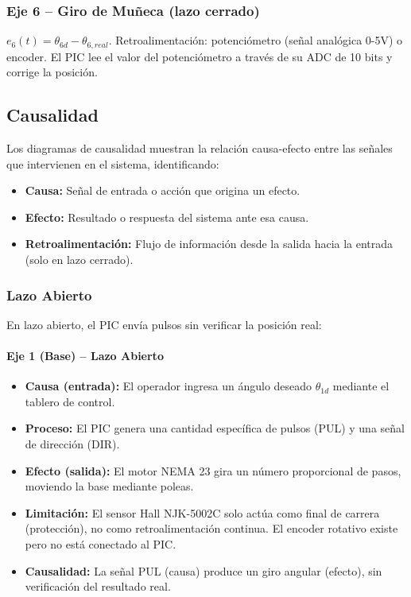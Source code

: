 \documentclass[11pt]{article}
\begin{document}
\subsubsection{Eje 6 – Giro de Muñeca (lazo cerrado)}

$e_6(t) = \theta_{6d} - \theta_{6,real}$. Retroalimentación: potenciómetro (señal analógica 0-5V) o encoder. El PIC lee el valor del potenciómetro a través de su ADC de 10 bits y corrige la posición.

\subsection{Causalidad}

Los diagramas de causalidad muestran la relación causa-efecto entre las señales que intervienen en el sistema, identificando:

\begin{itemize}
	\item \textbf{Causa:} Señal de entrada o acción que origina un efecto.
	\item \textbf{Efecto:} Resultado o respuesta del sistema ante esa causa.
	\item \textbf{Retroalimentación:} Flujo de información desde la salida hacia la entrada (solo en lazo cerrado).
\end{itemize}

\subsubsection{Lazo Abierto}

En lazo abierto, el PIC envía pulsos sin verificar la posición real:

\paragraph{Eje 1 (Base) – Lazo Abierto}
\begin{itemize}
	\item \textbf{Causa (entrada):} El operador ingresa un ángulo deseado $\theta_{1d}$ mediante el tablero de control.
	\item \textbf{Proceso:} El PIC genera una cantidad específica de pulsos (PUL) y una señal de dirección (DIR).
	\item \textbf{Efecto (salida):} El motor NEMA 23 gira un número proporcional de pasos, moviendo la base mediante poleas.
	\item \textbf{Limitación:} El sensor Hall NJK-5002C solo actúa como final de carrera (protección), no como retroalimentación continua. El encoder rotativo existe pero no está conectado al PIC.
	\item \textbf{Causalidad:} La señal PUL (causa) produce un giro angular (efecto), sin verificación del resultado real.
\end{itemize}
\end{document}
